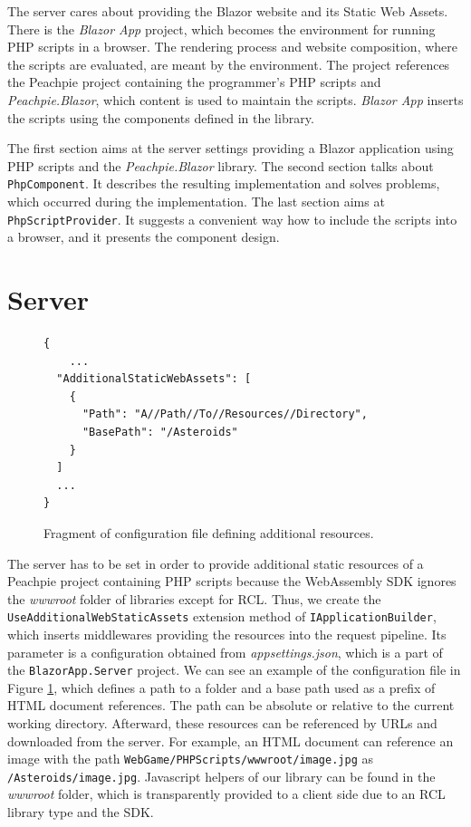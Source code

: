 The server cares about providing the Blazor website and its Static Web Assets.
There is the \textit{Blazor App} project, which becomes the environment for running PHP scripts in a browser.
The rendering process and website composition, where the scripts are evaluated, are meant by the environment.
The project references the Peachpie project containing the programmer's PHP scripts and \textit{Peachpie.Blazor}, which content is used to maintain the scripts.
\textit{Blazor App} inserts the scripts using the components defined in the library.
\par
The first section aims at the server settings providing a Blazor application using PHP scripts and the \textit{Peachpie.Blazor} library.
The second section talks about \texttt{PhpComponent}.
It describes the resulting implementation and solves problems, which occurred during the implementation.
The last section aims at \texttt{PhpScript\-Provider}.
It suggests a convenient way how to include the scripts into a browser, and it presents the component design.

\section{Server}

\begin{figure}[b!]
\begin{lstlisting}
{
	...
  "AdditionalStaticWebAssets": [
    {
      "Path": "A//Path//To//Resources//Directory",
      "BasePath": "/Asteroids"
    }
  ]
  ...
}

\end{lstlisting}
\caption{Fragment of configuration file defining additional resources.}
\label{img19:settings}
\end{figure}
\par
The server has to be set in order to provide additional static resources of a Peachpie project containing PHP scripts because the WebAssembly SDK ignores the \textit{wwwroot} folder of libraries except for RCL.
Thus, we create the \texttt{UseAdd\-itionalWebStaticAssets} extension method of \texttt{IApplicationBuilder}, which inserts middlewares providing the resources into the request pipeline.
Its parameter is a configuration obtained from \textit{appsettings.json}, which is a part of the \texttt{BlazorApp.Server} project.
We can see an example of the configuration file in Figure \ref{img19:settings}, which defines a path to a folder and a base path used as a prefix of HTML document references.
The path can be absolute or relative to the current working directory.
Afterward, these resources can be referenced by URLs and downloaded from the server.
For example, an HTML document can reference an image with the path \texttt{WebGame/PHPScripts/wwwroot/image.jpg} as \texttt{/Asteroids/image.jpg}.
Javascript helpers of our library can be found in the \textit{wwwroot} folder, which is transparently provided to a client side due to an RCL library type and the SDK.

